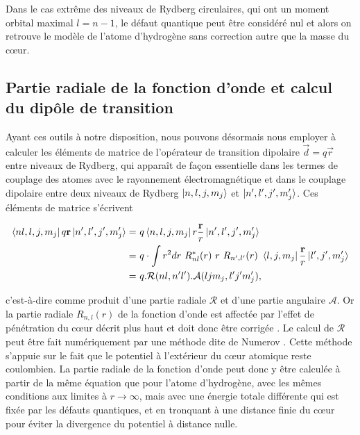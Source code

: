 Dans le cas extrême des niveaux de Rydberg circulaires, qui ont un moment orbital maximal $l=n-1$, le défaut quantique peut être considéré nul et alors on retrouve le modèle de l'atome d'hydrogène sans correction autre que la masse du c\oe ur.
		
	\subsection{Partie radiale de la fonction d'onde et calcul du dipôle de transition}
\noindent Ayant ces outils à notre disposition, nous pouvons désormais nous employer à calculer les éléments de matrice de l'opérateur de transition dipolaire $\vec{d}=q\vec{r}$ entre niveaux de Rydberg, qui apparaît de façon essentielle dans les termes de couplage des atomes avec le rayonnement électromagnétique et dans le couplage dipolaire entre deux niveaux de Rydberg $\ket{n,l,j,m_j}$ et $\ket{n',l',j',m_j'}$. Ces éléments de matrice s'écrivent

	\begin{equation}\label{eq:matrixelements}
	\begin{aligned}
	\bra{nl,l,j,m_j}q\mathbf{r}\ket{n',l',j',m_j'}= & ~q\bra{n,l,j,m_j} r\frac{\mathbf{r}}{r} \ket{n',l',j',m_j'} \\
	= & ~q\cdot \int r^2dr~R^*_{nl}(r)~r~R_{n',l'}(r)~ \bra{l,j,m_j}\frac{\mathbf{r}}{r}\ket{l',j',m_j'} \\
	= & ~q.\mathcal{R}(nl,n'l').\mathcal{A}(ljm_j,l'j'm_j')	 ,
	\end{aligned}
	\end{equation}
	
\noindent c'est-à-dire comme produit d'une partie radiale $\mathcal{R}$ et d'une partie angulaire $\mathcal{A}$.
Or la partie radiale $R_{n,l}(r)$ de la fonction d'onde est affectée par l'effet de pénétration du c\oe ur décrit plus haut et doit donc être corrigée \cite{TXT_GALLAGHER}.
Le calcul de $\mathcal{R}$ peut être fait numériquement par une méthode dite de Numerov \cite[pp.10-24]{TXT_GALLAGHER}.
Cette méthode s'appuie sur le fait que le potentiel à l'extérieur du c\oe ur atomique reste coulombien.
La partie radiale de la fonction d'onde peut donc y être calculée à partir de la même équation que pour l'atome d'hydrogène, avec les mêmes conditions aux limites à $r \rightarrow \infty$, mais avec une énergie totale différente qui est fixée par les défauts quantiques, et en tronquant à une distance finie du c\oe ur pour éviter la divergence du potentiel à distance nulle.

